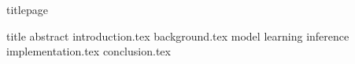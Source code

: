 \documentclass[fleqn,10pt,twoside]{article}
\begin{document}
  {titlepage}

  \cleardoublepage
  \thispagestyle{sectionstyle}
  \tableofcontents

  \cleardoublepage
  \thispagestyle{sectionstyle}
  {title}
  \bigskip
  {abstract}
  \bigskip
  {introduction.tex}
  {background.tex}
  {model}
  {learning}
  {inference}
  {implementation.tex}
  {conclusion.tex}

  \nocite{*}
  
  

\end{document}

